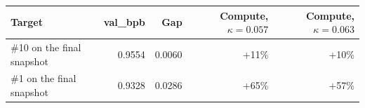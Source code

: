 {\small
\begin{tabular}{@{}lrrrr@{}}
\toprule
Target & val\_bpb & Gap & Compute, $\kappa=0.057$ & Compute, $\kappa=0.063$ \\
\midrule
\#10 on the final snapshot & 0.9554 & 0.0060 & +11\% & +10\% \\
\#1 on the final snapshot & 0.9328 & 0.0286 & +65\% & +57\% \\
\bottomrule
\end{tabular}
}
